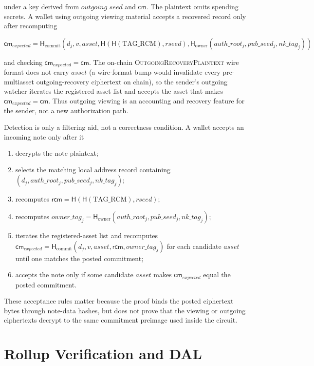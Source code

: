 \documentclass[11pt]{article}
\newcommand{\Hash}{\mathsf{H}}
\newcommand{\cm}{\mathsf{cm}}
\newcommand{\rcm}{\mathsf{rcm}}
\begin{document}
under a key derived from \(outgoing\_seed\) and \(\cm\). The plaintext omits
spending secrets. A wallet using outgoing viewing material accepts a recovered
record only after recomputing

\[
\cm_{expected} =
\Hash_{\mathrm{commit}}(d_j, v, asset, \Hash(\Hash(\mathrm{TAG\_RCM}), rseed),
\Hash_{\mathrm{owner}}(auth\_root_j, pub\_seed_j, nk\_tag_j))
\]

and checking \(\cm_{expected} = \cm\). The on-chain
\textsc{OutgoingRecoveryPlaintext} wire format does not carry
\(asset\) (a wire-format bump would invalidate every pre-multiasset
outgoing-recovery ciphertext on chain), so the sender's outgoing
watcher iterates the registered-asset list and accepts the asset
that makes \(\cm_{expected} = \cm\). Thus outgoing viewing is an
accounting and recovery feature for the sender, not a new
authorization path.

Detection is only a filtering aid, not a correctness condition. A wallet accepts
an incoming note only after it

\begin{enumerate}
  \item decrypts the note plaintext;
  \item selects the matching local address record containing
        \((d_j, auth\_root_j, pub\_seed_j, nk\_tag_j)\);
  \item recomputes \(\rcm = \Hash(\Hash(\mathrm{TAG\_RCM}), rseed)\);
  \item recomputes
        \(owner\_tag_j = \Hash_{\mathrm{owner}}(auth\_root_j, pub\_seed_j, nk\_tag_j)\);
  \item iterates the registered-asset list and recomputes
        \(\cm_{expected} = \Hash_{\mathrm{commit}}(d_j, v, asset, \rcm, owner\_tag_j)\)
        for each candidate \(asset\) until one matches the posted
        commitment;
  \item accepts the note only if some candidate \(asset\) makes
        \(\cm_{expected}\) equal the posted commitment.
\end{enumerate}

These acceptance rules matter because the proof binds the posted ciphertext
bytes through note-data hashes, but does not prove that the viewing or outgoing
ciphertexts decrypt to the same commitment preimage used inside the circuit.

\section{Rollup Verification and DAL}
\end{document}
